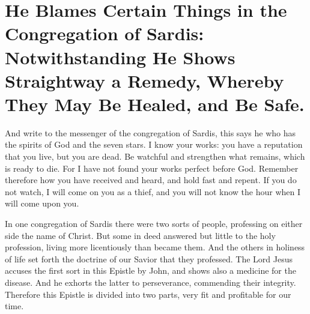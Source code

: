\chapter[Sermon 15. He Blames Certain Things in the Congregation of Sardis: Notwithstanding He Shows Straightway a Remedy, Whereby They May Be Healed, and Be Safe.]{He Blames Certain Things in the Congregation of Sardis: Notwithstanding He Shows Straightway a Remedy, Whereby They May Be Healed, and Be Safe.}
\label{sermon:015}

And write to the messenger of the congregation of Sardis, this says he who has the spirits of God and the seven stars. I know your works: you have a reputation that you live, but you are dead. Be watchful and strengthen what remains, which is ready to die. For I have not found your works perfect before God. Remember therefore how you have received and heard, and hold fast and repent. If you do not watch, I will come on you as a thief, and you will not know the hour when I will come upon you.

In one congregation of Sardis there were two sorts of people, professing on either side the name of Christ. But some in deed answered but little to the holy profession, living more licentiously than became them. And the others in holiness of life set forth the doctrine of our Savior that they professed. The Lord Jesus accuses the first sort in this Epistle by John, and shows also a medicine for the disease. And he exhorts the latter to perseverance, commending their integrity. Therefore this Epistle is divided into two parts, very fit and profitable for our time.

